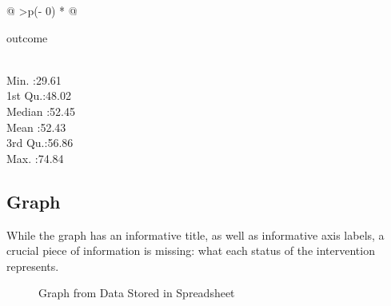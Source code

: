 \documentclass[
  letterpaper,
  DIV=11,
  numbers=noendperiod]{scrreprt}
\begin{document}
\begin{longtable}[]{@{}
  >{\centering\arraybackslash}p{(\columnwidth - 0\tabcolsep) * }@{}}

\caption{\label{tbl-descriptives2}Descriptive Statistics}

\tabularnewline

\toprule\noalign{}
\begin{minipage}[b]{\linewidth}\centering
outcome
\end{minipage} \\
\midrule\noalign{}
\endhead
\bottomrule\noalign{}
\endlastfoot
Min. :29.61 \\
1st Qu.:48.02 \\
Median :52.45 \\
Mean :52.43 \\
3rd Qu.:56.86 \\
Max. :74.84 \\

\end{longtable}

\subsection{Graph}\label{graph-1}

While the graph has an informative title, as well as informative axis
labels, a crucial piece of information is missing: what each status of
the intervention represents.

\begin{figure}


\caption{\label{fig-graph-spreadsheet}Graph from Data Stored in
Spreadsheet}

\end{figure}%
\end{document}
